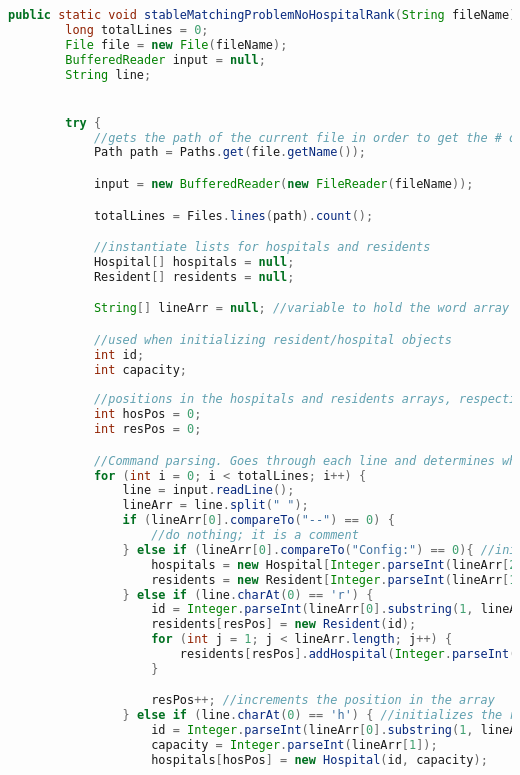 \documentclass[letterpaper, 10pt,DIV=13]{scrartcl}
\numberwithin{equation}{section} %
\numberwithin{figure}{section} %
\numberwithin{table}{section} %
\begin{document}
\begin{lstlisting}[frame=single, language=java, breaklines]
    public static void stableMatchingProblemNoHospitalRank(String fileName) throws IOException {
        long totalLines = 0;
        File file = new File(fileName);
        BufferedReader input = null;
        String line;


        try {
            //gets the path of the current file in order to get the # of lines
            Path path = Paths.get(file.getName());

            input = new BufferedReader(new FileReader(fileName)); 

            totalLines = Files.lines(path).count();

            //instantiate lists for hospitals and residents
            Hospital[] hospitals = null;
            Resident[] residents = null;

            String[] lineArr = null; //variable to hold the word array of the current line

            //used when initializing resident/hospital objects
            int id;
            int capacity;
            
            //positions in the hospitals and residents arrays, respectively
            int hosPos = 0;
            int resPos = 0; 

            //Command parsing. Goes through each line and determines what command is being used based on strings.
            for (int i = 0; i < totalLines; i++) {
                line = input.readLine();
                lineArr = line.split(" ");
                if (lineArr[0].compareTo("--") == 0) {
                    //do nothing; it is a comment
                } else if (lineArr[0].compareTo("Config:") == 0){ //initialize the array size of the total hospitals and residents
                    hospitals = new Hospital[Integer.parseInt(lineArr[2])];
                    residents = new Resident[Integer.parseInt(lineArr[1])];
                } else if (line.charAt(0) == 'r') {
                    id = Integer.parseInt(lineArr[0].substring(1, lineArr[0].length() - 1));
                    residents[resPos] = new Resident(id);
                    for (int j = 1; j < lineArr.length; j++) {
                        residents[resPos].addHospital(Integer.parseInt(lineArr[j].substring(1)));
                    }

                    resPos++; //increments the position in the array
                } else if (line.charAt(0) == 'h') { //initializes the rankings of each resident. First index is first choice, last is last choice.
                    id = Integer.parseInt(lineArr[0].substring(1, lineArr[0].length() - 1));
                    capacity = Integer.parseInt(lineArr[1]);
                    hospitals[hosPos] = new Hospital(id, capacity);


\end{lstlisting}
\end{document}
